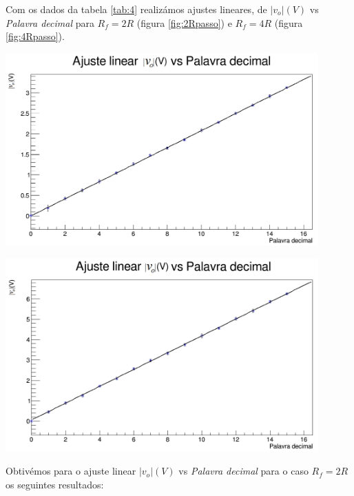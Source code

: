 \documentclass[a4paper,11pt]{report}
\begin{document}
Com os dados da tabela \ref{tab:4} realizámos ajustes lineares, de $|v_o| (V)$ vs \textit{Palavra decimal} para $R_f=2R$ (figura \ref{fig:2Rpasso}) e $R_f=4R$ (figura \ref{fig:4Rpasso}).

\begin{center}
     \includegraphics[angle=0,width=0.9\textwidth]{2Rpasso.png}
     \label{fig:2Rpasso}
     \end{center}



     
\begin{center}
     \includegraphics[angle=0,width=0.9\textwidth]{4Rpasso.png}
     \label{fig:4Rpasso}
     \end{center}


Obtivémos para o ajuste linear $|v_o| (V)$ vs \textit{Palavra decimal} para o caso $R_f=2R$ os seguintes resultados:
\end{document}
